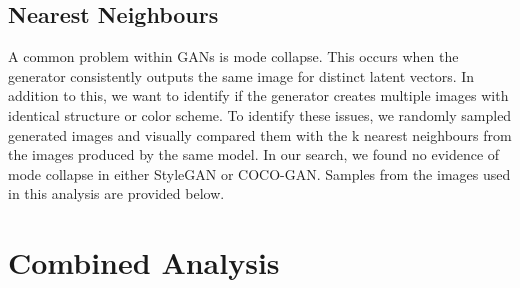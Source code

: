 \documentclass[10pt]{article}
\begin{document}
\begin{multicols*}{2}
        \subsection{Nearest Neighbours}
        \label{subsec:nearestneighbours}
        A common problem within GANs is mode collapse.
        This occurs when the generator consistently outputs the same image for distinct latent vectors.
        In addition to this, we want to identify if the generator creates multiple images with identical structure or color scheme.
        To identify these issues, we randomly sampled generated images and visually compared them with the k nearest neighbours from the images produced by the same model.
        In our search, we found no evidence of mode collapse in either StyleGAN or COCO-GAN. Samples from the images used in this analysis are provided below.

        \section{Combined Analysis}
        \label{sec:combinedAnalysis}

\end{multicols*}
\end{document}
